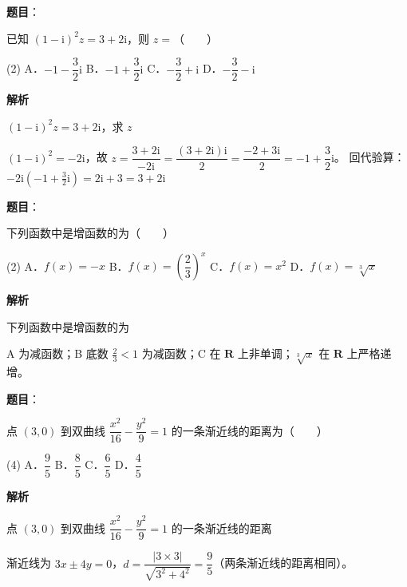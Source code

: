 \begin{answer}

\textbf{题目}：

已知 $(1-\mathrm i)^{2}z=3+2\mathrm i$，则 $z=$\mbox{（　　）}

\begin{gkopts}(2)
\task A．$-1-\dfrac32\mathrm i$
\task B．$-1+\dfrac32\mathrm i$
\task C．$-\dfrac32+\mathrm i$
\task D．$-\dfrac32-\mathrm i$
\end{gkopts}

\textbf{解析}

$(1-\mathrm i)^{2}z=3+2\mathrm i$，求 $z$

$(1-\mathrm i)^2=-2\mathrm i$，故 $z=\dfrac{3+2\mathrm i}{-2\mathrm i}=\dfrac{(3+2\mathrm i)\mathrm i}2=\dfrac{-2+3\mathrm i}2=-1+\dfrac32\mathrm i$。
回代验算：$-2\mathrm i\left(-1+\tfrac32\mathrm i\right)=2\mathrm i+3=3+2\mathrm i$ 


\end{answer}
\begin{answer}

\textbf{题目}：

下列函数中是增函数的为\mbox{（　　）}

\begin{gkopts}(2)
\task A．$f(x)=-x$
\task B．$f(x)=\left(\dfrac23\right)^{x}$
\task C．$f(x)=x^{2}$
\task D．$f(x)=\sqrt[3]{x}$
\end{gkopts}

\textbf{解析}

下列函数中是增函数的为

A 为减函数；B 底数 $\tfrac23<1$ 为减函数；C 在 $\mathbf R$ 上非单调；$\sqrt[3]{x}$ 在 $\mathbf R$ 上严格递增。


\end{answer}
\begin{answer}

\textbf{题目}：

点 $(3,0)$ 到双曲线 $\dfrac{x^{2}}{16}-\dfrac{y^{2}}9=1$ 的一条渐近线的距离为\mbox{（　　）}

\begin{gkopts}(4)
\task A．$\dfrac95$
\task B．$\dfrac85$
\task C．$\dfrac65$
\task D．$\dfrac45$
\end{gkopts}

\textbf{解析}

点 $(3,0)$ 到双曲线 $\dfrac{x^2}{16}-\dfrac{y^2}9=1$ 的一条渐近线的距离

渐近线为 $3x\pm4y=0$，$d=\dfrac{|3\times3|}{\sqrt{3^2+4^2}}=\dfrac95$（两条渐近线的距离相同）。


\end{answer}
